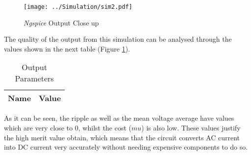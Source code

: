 \begin{figure}[H]
    \centering
    \texttt{[image: ../Simulation/sim2.pdf]}
    \caption{{\it Ngspice} Output Close up}
    \label{fig:ngsOutClose}
\end{figure}



The quality of the output from this simulation can be analysed through the values shown in the next table (Figure \ref{tab:ngsOutParam}).

\begin{table}[H]
  \centering
  \begin{tabular}{|l|r|}
    \hline    
    {\bf Name} & {\bf Value} \\ \hline
    
  \end{tabular}
  \caption{Output Parameters}
  \label{tab:ngsOutParam}
\end{table}


As it can be seen, the ripple as well as the mean voltage average have values which are very close to 0, whilst the cost ($mu$) is also low. These values justify the high merit value obtain, which means that the circuit converts AC current into DC current very accurately without needing expensive components to do so.



